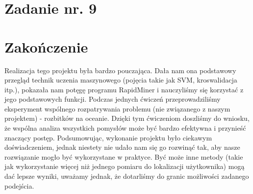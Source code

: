 \documentclass{article}
\begin{document}
\section{Zadanie nr. 9}
\section{Zakończenie}
Realizacja tego projektu była bardzo pouczająca. Dała nam ona podstawowy przegląd technik uczenia maszynowego (pojęcia takie jak SVM, kroswalidacja itp.), pokazała nam potęgę programu RapidMiner i nauczyliśmy się korzystać z jego podstawowych funkcji. Podczas jednych ćwiczeń przeprowadziliśmy eksperyment wspólnego rozpatrywania problemu (nie związanego z naszym projektem) - rozbitków na oceanie. Dzięki tym ćwiczeniom doszliśmy do wniosku, że wspólna analiza wszystkich pomysłów może być bardzo efektywna i przynieść znaczący postęp. Podsumowując, wykonanie projektu było ciekawym doświadczeniem, jednak niestety nie udało nam się go rozwinąć tak, aby nasze rozwiązanie mogło być wykorzystane w praktyce. Być może inne metody (takie jak wykorzystanie więcej niż jednego pomiaru do lokalizacji użytkownika) mogą dać lepsze wyniki, uważamy jednak, że dotarliśmy do granic możliwości zadanego podejścia. 
\end{document}
